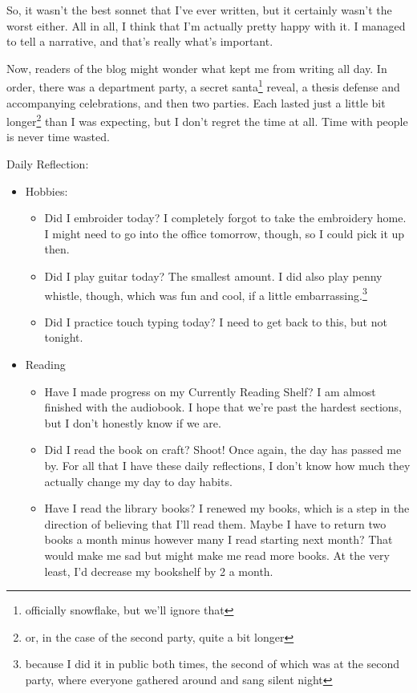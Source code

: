 \documentclass[12pt]{article}[titlepage]
\newcommand{\1}{\={a}}
\newcommand{\2}{\={e}}
\newcommand{\3}{\={\i}}
\newcommand{\4}{\=o}
\newcommand{\5}{\=u}
\newcommand{\6}{\={A}}
\renewcommand{\,}{\textsuperscript{,}}
\begin{document}
So, it wasn't the best sonnet that I've ever written, but it certainly wasn't the worst either.
All in all, I think that I'm actually pretty happy with it.
I managed to tell a narrative, and that's really what's important.

Now, readers of the blog might wonder what kept me from writing all day.
In order, there was a department party, a secret santa\footnote{officially snowflake, but we'll ignore that} reveal, a thesis defense and accompanying celebrations, and then two parties.
Each lasted just a little bit longer\footnote{or, in the case of the second party, quite a bit longer} than I was expecting, but I don't regret the time at all.
Time with people is never time wasted.

Daily Reflection:
\begin{itemize}
\item Hobbies:
\begin{itemize}
\item Did I embroider today? I completely forgot to take the embroidery home. I might need to go into the office tomorrow, though, so I could pick it up then.
\item Did I play guitar today? The smallest amount. I did also play penny whistle, though, which was fun and cool, if a little embarrassing.\footnote{because I did it in public both times, the second of which was at the second party, where everyone gathered around and sang silent night}
\item Did I practice touch typing today? I need to get back to this, but not tonight.
\end{itemize}
\item Reading
\begin{itemize}
\item Have I made progress on my Currently Reading Shelf? I am almost finished with the audiobook. I hope that we're past the hardest sections, but I don't honestly know if we are.
\item Did I read the book on craft? Shoot! Once again, the day has passed me by. For all that I have these daily reflections, I don't know how much they actually change my day to day habits.
\item Have I read the library books? I renewed my books, which is a step in the direction of believing that I'll read them. Maybe I have to return two books a month minus however many I read starting next month? That would make me sad but might make me read more books. At the very least, I'd decrease my bookshelf by 2 a month.
\end{itemize}

\end{itemize}
\end{document}
